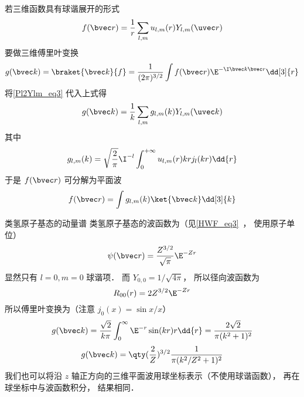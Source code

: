 若三维函数具有球谐展开的形式
\begin{equation}
f(\bvec r) = \frac{1}{r}\sum_{l,m} u_{l,m}(r) Y_{l,m}(\uvec r)
\end{equation}
要做三维傅里叶变换
\begin{equation}
g(\bvec k) = \braket{\bvec k}{f} =  \frac{1}{(2\pi)^{3/2}} \int f(\bvec r) \E^{-\I \bvec k \bvec r} \dd[3]{r}
\end{equation}
将\autoref{Pl2Ylm_eq3} 代入上式得
\begin{equation}
g(\bvec k) = \frac{1}{k} \sum_{l,m} g_{l,m}(k)  Y_{l,m}(\uvec k) 
\end{equation}
其中
\begin{equation}
g_{l,m}(k) = \sqrt{\frac{2}{\pi}} \I^{-l} \int_0^{+\infty} u_{l,m}(r) kr j_l(kr) \dd{r}
\end{equation}
于是 $f(\bvec r)$ 可分解为平面波
\begin{equation}
f(\bvec r) = \int g_{l,m}(k) \ket{\bvec k} \dd[3]{k}
\end{equation}

\begin{example}{类氢原子基态的动量谱}\label{Pl2Ylm_ex1}
类氢原子基态的波函数为（见\autoref{HWF_eq3}~， 使用原子单位）
\begin{equation}
\psi(\bvec r) = \frac{Z^{3/2}}{\sqrt\pi} \E^{-Zr}
\end{equation}
显然只有 $l = 0, m = 0$ 球谐项． 而 $Y_{0,0} = 1/\sqrt{4\pi}$， 所以径向波函数为
\begin{equation}
R_{00}(r) = 2 Z^{3/2} \E^{-Zr}
\end{equation}
所以傅里叶变换为（注意 $j_0(x) = \sin x/x$）
\begin{equation}
g(\bvec k) = \frac{\sqrt{2}}{k\pi} \int_0^\infty \E^{-r} \sin(kr) r \dd{r} = \frac{2\sqrt{2}}{\pi(k^2+1)^2}
\end{equation}
\begin{equation}
g(\bvec k) = \qty(\frac{2}{Z})^{3/2} \frac{1}{\pi(k^2/Z^2 + 1)^2}
\end{equation}
我们也可以将沿 $z$ 轴正方向的三维平面波用球坐标表示（不使用球谐函数）， 再在球坐标中与波函数积分， 结果相同．
\end{example}

